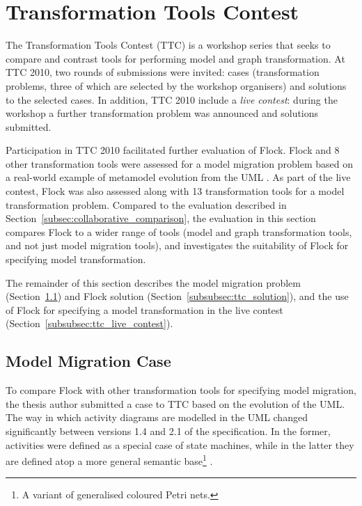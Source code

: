 
\section{Transformation Tools Contest}
The Transformation Tools Contest (TTC) is a workshop series that seeks to compare and contrast tools for performing model and graph transformation. At TTC 2010, two rounds of submissions were invited: cases (transformation problems, three of which are selected by the workshop organisers) and solutions to the selected cases. In addition, TTC 2010 include a \emph{live contest}: during the workshop a further transformation problem was announced and solutions submitted.

Participation in TTC 2010 facilitated further evaluation of Flock. Flock and 8 other transformation tools were assessed for a model migration problem based on a real-world example of metamodel evolution from the UML \cite{uml22}. As part of the live contest, Flock was also assessed along with 13 transformation tools for a model transformation problem. Compared to the evaluation described in Section~\ref{subsec:collaborative_comparison}, the evaluation in this section compares Flock to a wider range of tools (model and graph transformation tools, and not just model migration tools), and investigates the suitability of Flock for specifying model transformation.

The remainder of this section describes the model migration problem (Section~\ref{subsubsec:ttc_case}) and Flock solution (Section~\ref{subsubsec:ttc_solution}), and the use of Flock for specifying a model transformation in the live contest (Section~\ref{subsubsec:ttc_live_contest}).

\subsection{Model Migration Case}
\label{subsubsec:ttc_case}
To compare Flock with other transformation tools for specifying model migration, the thesis author submitted a case to TTC based on the evolution of the UML. The way in which activity diagrams are modelled in the UML changed significantly between versions 1.4 and 2.1 of the specification. In the former, activities were defined as a special case of state machines, while in the latter they are defined atop a more general semantic base\footnote{A variant of generalised coloured Petri nets.} \cite{selic05uml2}.

